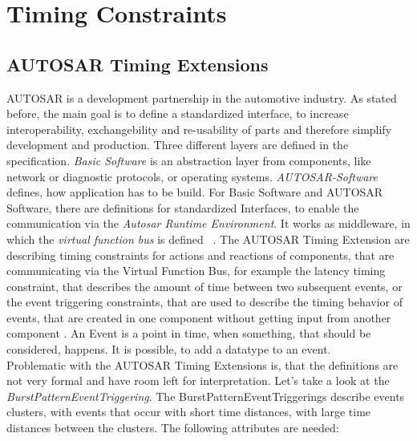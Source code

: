
\chapter{Timing Constraints}
\label{chapter-TimingConstraints}

\section{AUTOSAR Timing Extensions}
AUTOSAR is a development partnership in the automotive industry. As stated before, the main goal is to define a standardized interface, to increase interoperability, exchangebility and re-usability of parts and therefore simplify development and production. Three different layers are defined in the specification. \emph{Basic Software} is an abstraction layer from components, like network or diagnostic protocols, or operating systems. \emph{AUTOSAR-Software} defines, how application has to be build. For Basic Software and AUTOSAR Software, there are definitions for standardized Interfaces, to enable the communication via the \emph{Autosar Runtime Environment}. It works as middleware, in which the \emph{virtual function bus} is defined ~\cite{Virtual_Functional_Bus}.
The AUTOSAR Timing Extension are describing timing constraints for actions and reactions of components, that are communicating via the Virtual Function Bus, for example the latency timing constraint, that describes the amount of time between two subsequent events, or the event triggering constraints, that are used to describe the timing behavior of events, that are created in one component without getting input from another component \cite{TIMEX}. An Event is a point in time, when something, that should be considered, happens. It is possible, to add a datatype to an event.\\
Problematic with the AUTOSAR Timing Extensions is, that the definitions are not very formal and have room left for interpretation. Let's take a look at the \emph{BurstPatternEventTriggering}. The BurstPatternEventTriggerings describe events clusters, with events that occur with short time distances, with large time distances between the clusters. The following attributes are needed:\\ \\
